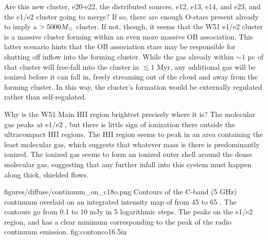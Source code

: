Are this new cluster, e20-e22, the distributed sources, e12, e13, e14, and e23,
and the e1/e2 cluster going to merge?  If so, there are enough O-stars present
already to imply a $>5000 M_{\odot}$ cluster.  If not, though, it seems that the
W51 e1/e2 cluster is a massive cluster forming within an even more massive OB
association.  This latter scenario hints that the OB association stars may be
responsible for shutting off inflow into the forming cluster.  While the gas
already within $\sim 1$ pc of that cluster will free-fall into the cluster in
$\lesssim 1$ Myr, any additional gas will be ionized before it can fall in,
freely streaming out of the cloud and away from the forming cluster.  In this
way, the cluster's formation would be externally regulated rather than
self-regulated.

Why is the W51 Main HII region brightest precisely where it is?  The molecular
gas peaks at e1/e2 \citep{Parsons2012a}, but there is little sign of ionization
there outside the ultracompact HII regions.  The HII region seems to peak in an
area containing the least molecular gas, which suggests that whatever mass is
there is predominantly ionized.  The ionized gas seems to form an ionized outer
shell around the dense molecular gas, suggesting that any further infall into
this system must happen along thick, shielded flows.

\Figure
{figures/diffuse/continuum_on_c18o.png}
{Contours of the C-band (5 GHz) continuum overlaid on an integrated intensity
map of \ceighteeno from 45 to 65 \kms \citep{Parsons2012a}.  The contours
go from 0.1 to 10 mJy in 5 logarithmic steps.  The \ceighteeno peaks on the
e1/e2 region, and has a clear minimum corresponding to the peak of the radio
continuum emission.
}
{fig:contonco}{1}{6.5in}


%
%
%


